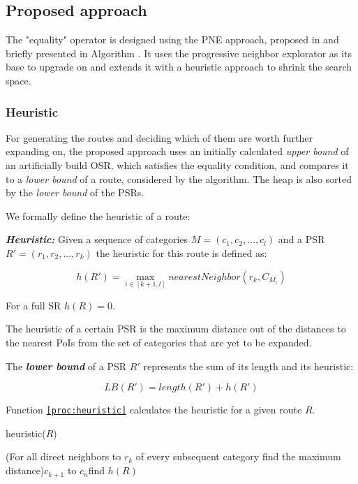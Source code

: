 \subsection{Proposed approach} 
\label{sec:approachEO}
The "equality" operator is designed using the PNE approach, proposed in \cite{OSR} and briefly presented in Algorithm \texttt{}. It uses the progressive neighbor explorator as its base to upgrade on and extends it with a heuristic approach to shrink the search space.

\subsubsection{Heuristic}
\label{sec:heuristic}
For generating the routes and deciding which of them are worth further expanding on, the proposed approach uses an initially calculated \textit{upper bound} of an artificially build OSR, which satisfies the equality condition, and compares it to a \textit{lower bound} of a route, considered by the algorithm. The heap is also sorted by the \textit{lower bound} of the PSRs. 

We formally define the heuristic of a route:

\textbf{\textit{Heuristic:}} Given a sequence of categories $M = (c_1, c_2, ..., c_l)$ and a PSR $R' = (r_1, r_2, ..., r_k)$ the heuristic for this route is defined as: 

\begin{equation}
h(R') = \max_{i \in [k+1, l]} nearestNeighbor(r_k, C_{M_{i}})
\end{equation}

For a full SR $h(R) = 0$.

The heuristic of a certain PSR is the maximum distance out of the distances to the nearest PoIs from the set of categories that are yet to be expanded. 

The \textbf{\textit{lower bound}} of a PSR $R'$ represents the sum of its length and its heuristic:

\begin{equation}
LB(R') = length(R') + h(R')
\end{equation}

Function \texttt{\ref{proc:heuristic}} calculates the heuristic for a given route $R$.

\begin{function}[htb!]
\caption{heuristic($R$)}
\label{proc:heuristic}

	\For(For all direct neighbors to $r_k$ of every subsequent category find the maximum distance){$c_{k+1}$ to $c_n$}{find $h(R)$\;}	

\end{function}

